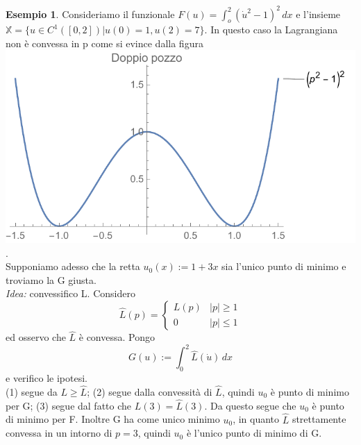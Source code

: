 \documentclass[a4paper]{book}
\theoremstyle{definition}
\newtheorem{ex}{Esempio}
\theoremstyle{remark}
\theoremstyle{definition}
\newcommand{\bbx}{\mathbb{X}}
\begin{document}
\begin{ex}
Consideriamo il funzionale $F(u) = \int_{o}^{2}(\dot{u}^2 - 1)^2\,dx$ e l'insieme $\bbx = \{ u \in C^1([0,2])| u(0)=1, u(2)=7\}$. In questo caso la Lagrangiana non è convessa in p come si evince dalla figura$\qquad$
\includegraphics[scale=0.4]{doppio-pozzo.pdf}.\\
Supponiamo adesso che la retta $u_0(x) := 1 +3x$ sia l'unico punto di minimo e troviamo la G giusta.\\
\textit{Idea:} convessifico L. Considero
\[
	\hat{L}(p) = \begin{cases}
	L(p) & |p|\ge 1 \\
	0 & |p| \le 1
	\end{cases}
\]
ed osservo che $\hat{L}$ è convessa. Pongo
\[
	G(u) := \int_{0}^{2} \hat{L}(\dot{u})\,dx
\]
e verifico le ipotesi.\\
(1) segue da $L \ge \hat{L}$; (2) segue dalla convessità di $\hat{L}$, quindi $u_0$ è punto di minimo per G; (3) segue dal fatto che $L(3) = \hat{L}(3)$. Da questo segue che $u_0$ è punto di minimo per F. Inoltre G ha come unico minimo $u_0$, in quanto $\hat{L}$ strettamente convessa in un intorno di $p=3$, quindi $u_0$ è l'unico punto di minimo di G.
\end{ex}
\end{document}
